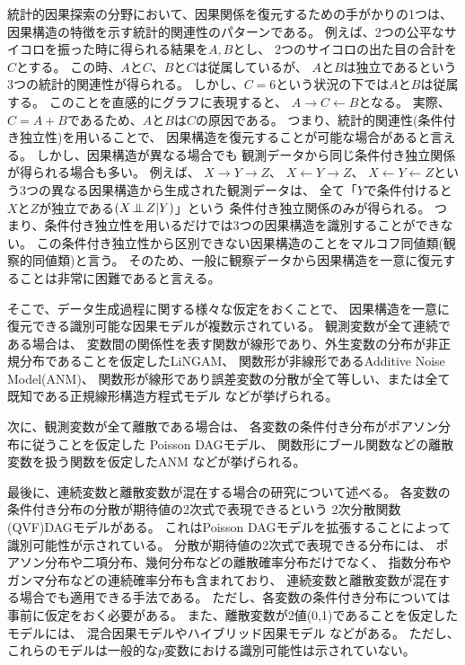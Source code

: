 統計的因果探索の分野において、因果関係を復元するための手がかりの1つは、
因果構造の特徴を示す統計的関連性のパターンである\cite{Pearl2009-oh}。
例えば、2つの公平なサイコロを振った時に得られる結果を$A, B$とし、
2つのサイコロの出た目の合計を$C$とする。
この時、$A$と$C$、$B$と$C$は従属しているが、
$A$と$B$は独立であるという3つの統計的関連性が得られる。
しかし、$C=6$という状況の下では$A$と$B$は従属する。
このことを直感的にグラフに表現すると、
$A \rightarrow C \leftarrow B$となる。
実際、$C=A+B$であるため、$A$と$B$は$C$の原因である。
つまり、統計的関連性(条件付き独立性)を用いることで、
因果構造を復元することが可能な場合があると言える。
しかし、因果構造が異なる場合でも
観測データから同じ条件付き独立関係が得られる場合も多い。
例えば、
$X \rightarrow Y \rightarrow Z$、
$X \leftarrow Y \rightarrow Z$、
$X \leftarrow Y \leftarrow Z$という3つの異なる因果構造から生成された観測データは、
全て「$Y$で条件付けると$X$と$Z$が独立である$(X \mathop{\,\perp\!\!\!\!\!\!\perp\,} Z | Y)$」という
条件付き独立関係のみが得られる。
つまり、条件付き独立性を用いるだけでは3つの因果構造を識別することができない。
この条件付き独立性から区別できない因果構造のことをマルコフ同値類(観察的同値類)と言う\cite{Pearl2009-oh}。
そのため、一般に観察データから因果構造を一意に復元することは非常に困難であると言える。

そこで、データ生成過程に関する様々な仮定をおくことで、
因果構造を一意に復元できる識別可能な因果モデルが複数示されている。
観測変数が全て連続である場合は、
変数間の関係性を表す関数が線形であり、外生変数の分布が非正規分布であることを仮定したLiNGAM\cite{Shimizu2006-yu}、
関数形が非線形であるAdditive Noise Model(ANM)\cite{Hoyer2008-oo}、
関数形が線形であり誤差変数の分散が全て等しい、または全て既知である正規線形構造方程式モデル\cite{Peters2013-eb}
などが挙げられる。

次に、観測変数が全て離散である場合は、
各変数の条件付き分布がポアソン分布に従うことを仮定した
Poisson DAGモデル\cite{Park2015-tj}、
関数形にブール関数などの離散変数を扱う関数を仮定したANM\cite{Peters2011-ew}
などが挙げられる。

最後に、連続変数と離散変数が混在する場合の研究について述べる。
各変数の条件付き分布の分散が期待値の2次式で表現できるという
2次分散関数(QVF)DAGモデル\cite{Park2017-hw}がある。
これはPoisson DAGモデル\cite{Park2015-tj}を拡張することによって
識別可能性が示されている。
分散が期待値の2次式で表現できる分布には、
ポアソン分布や二項分布、幾何分布などの離散確率分布だけでなく、
指数分布やガンマ分布などの連続確率分布も含まれており、
連続変数と離散変数が混在する場合でも適用できる手法である。
ただし、各変数の条件付き分布については事前に仮定をおく必要がある。
また、離散変数が2値(0,1)であることを仮定したモデルには、
混合因果モデル\cite{Wenjuan2018-nm}やハイブリッド因果モデル\cite{Li2018-aw}
などがある。
ただし、これらのモデルは一般的な$p$変数における識別可能性は示されていない。
